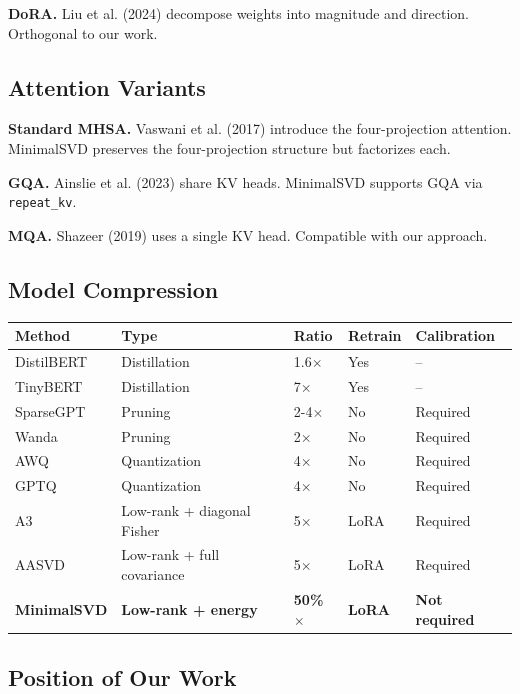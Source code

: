 \textbf{DoRA.} Liu et al. (2024) decompose weights into magnitude and direction. 
Orthogonal to our work.

\subsection{Attention Variants}

\textbf{Standard MHSA.} Vaswani et al. (2017) introduce the four-projection 
attention. MinimalSVD preserves the four-projection structure but factorizes 
each.

\textbf{GQA.} Ainslie et al. (2023) share KV heads. MinimalSVD supports GQA via 
\texttt{repeat\_kv}.

\textbf{MQA.} Shazeer (2019) uses a single KV head. Compatible with our approach.

\subsection{Model Compression}

\begin{table}[H]
\centering
\small
\begin{tabular}{lllll}
\toprule
\textbf{Method} & \textbf{Type} & \textbf{Ratio} & \textbf{Retrain} & \textbf{Calibration} \\
\midrule
DistilBERT & Distillation & 1.6$\times$ & Yes & -- \\
TinyBERT & Distillation & 7$\times$ & Yes & -- \\
SparseGPT & Pruning & 2-4$\times$ & No & Required \\
Wanda & Pruning & 2$\times$ & No & Required \\
AWQ & Quantization & 4$\times$ & No & Required \\
GPTQ & Quantization & 4$\times$ & No & Required \\
A3 & Low-rank + diagonal Fisher & 5$\times$ & LoRA & Required \\
AASVD & Low-rank + full covariance & 5$\times$ & LoRA & Required \\
\textbf{MinimalSVD} & \textbf{Low-rank + energy} & \textbf{50\%$\times$} & \textbf{LoRA} & \textbf{Not required} \\
\bottomrule
\end{tabular}
\end{table}

\subsection{Position of Our Work}

